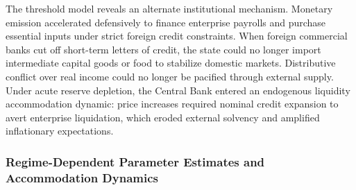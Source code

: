 The threshold model reveals an alternate institutional mechanism. Monetary emission accelerated defensively to finance enterprise payrolls and purchase essential inputs under strict foreign credit constraints. When foreign commercial banks cut off short-term letters of credit, the state could no longer import intermediate capital goods or food to stabilize domestic markets. Distributive conflict over real income could no longer be pacified through external supply. Under acute reserve depletion, the Central Bank entered an endogenous liquidity accommodation dynamic: price increases required nominal credit expansion to avert enterprise liquidation, which eroded external solvency and amplified inflationary expectations.


\subsubsection{Regime-Dependent Parameter Estimates and Accommodation Dynamics}
\label{sec:tvar_parameter_estimates}



